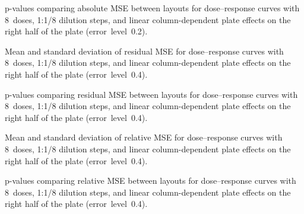 \begin{table}[p]
    \centering
    \small
    
    \caption{p-values comparing absolute \ECIC{} MSE between layouts for dose--response curves with 8~doses, 1:1/8 dilution steps, and linear column-dependent plate effects on the right half of the plate (error~level~0.2).}
    \label{tab:dr-absic50-pvalues-8doses-dil8-half-columns-neg-controls-0.2}
\end{table}

\begin{table}[p]
    \centering
    \small
    
    \caption{Mean and standard deviation of residual MSE for dose--response curves with 8~doses, 1:1/8 dilution steps, and linear column-dependent plate effects on the right half of the plate (error~level~0.4).}
    \label{tab:dr-residuals-mean-std-8doses-dil8-half-columns-neg-controls-0.4}
\end{table}

\begin{table}[p]
    \centering
    \small
    
    \caption{p-values comparing residual MSE between layouts for dose--response curves with 8~doses, 1:1/8 dilution steps, and linear column-dependent plate effects on the right half of the plate (error~level~0.4).}
    \label{tab:dr-residuals-pvalues-8doses-dil8-half-columns-neg-controls-0.4}
\end{table}

\begin{table}[p]
    \centering
    \small
    
    \caption{Mean and standard deviation of relative \ECIC{} MSE for dose--response curves with 8~doses, 1:1/8 dilution steps, and linear column-dependent plate effects on the right half of the plate (error~level~0.4).}
    \label{tab:dr-relic50-mean-std-8doses-dil8-half-columns-neg-controls-0.4}
\end{table}

\begin{table}[p]
    \centering
    \small
    
    \caption{p-values comparing relative \ECIC{} MSE between layouts for dose--response curves with 8~doses, 1:1/8 dilution steps, and linear column-dependent plate effects on the right half of the plate (error~level~0.4).}
    \label{tab:dr-relic50-pvalues-8doses-dil8-half-columns-neg-controls-0.4}
\end{table}

